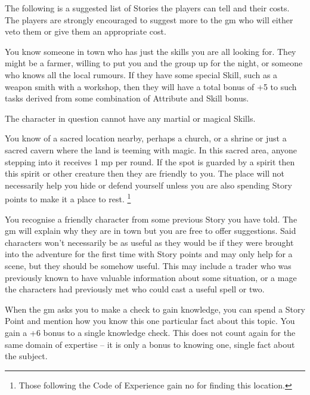 \begin{multicols}{2}

\noindent
The following is a suggested list of Stories the players can tell and their costs. The players are strongly encouraged to suggest more to the \gls{gm} who will either veto them or give them an appropriate cost.

You know someone in town who has just the skills you are all looking for.
They might be a farmer, willing to put you and the group up for the night, or someone who knows all the local rumours.
If they have some special Skill, such as a weapon smith with a workshop, then they will have a total bonus of +5 to such tasks derived from some combination of Attribute and Skill bonus.

The character in question cannot have any martial or magical Skills.

You know of a sacred location nearby, perhaps a church, or a shrine or just a sacred cavern where the land is teeming with magic.
In this sacred area, anyone stepping into it receives 1 \gls{mp} per \gls{round}.
If the spot is guarded by a spirit then this spirit or other creature then they are friendly to you.
The place will not necessarily help you hide or defend yourself unless you are also spending Story points to make it a place to rest.
\footnote{Those following the Code of Experience gain no  for finding this location.}

You recognise a friendly character from some previous Story you have told. The \gls{gm} will explain why they are in town but you are free to offer suggestions. Said characters won't necessarily be as useful as they would be if they were brought into the adventure for the first time with Story points and may only help for a scene, but they should be somehow useful. This may include a trader who was previously known to have valuable information about some situation, or a mage the characters had previously met who could cast a useful spell or two.

When the \gls{gm} asks you to make a check to gain knowledge, you can spend a Story Point and mention how you know this one particular fact about this topic. You gain a +6 bonus to a single knowledge check. This does not count again for the same domain of expertise -- it is only a bonus to knowing one, single fact about the subject.


\end{multicols}
